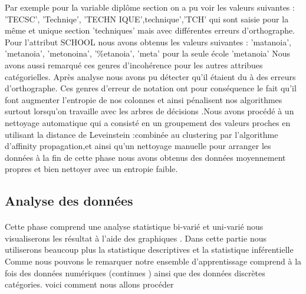 Par exemple pour la variable diplôme section on a pu voir les valeurs suivantes : 'TECSC', 'Techniqe',
'TECHN IQUE',technique','TCH' qui sont saisie pour la même et unique
section 'techniques' mais avec différentes erreurs d'orthographe. \\
Pour l'attribut SCHOOL nous avons obtenus les valeurs suivantes :
'matanoia', 'metanoia', 'metonoina', '\%etanoia', 'meta' pour la seule école 'metanoia'
Nous avons aussi remarqué ces genres d'incohérence pour les autres attribues catégorielles.  
Après analyse nous avons pu détecter qu'il étaient  du à des erreurs d'orthographe.
Ces genres d'erreur de notation ont pour conséquence le fait qu'il font
augmenter l'entropie de nos colonnes et ainsi pénalisent nos algorithmes
surtout lorsqu'on travaille avec les arbres de décisions .Nous avons
procédé à un nettoyage automatique qui a consisté en un groupement des
valeurs proches en utilisant la distance de Leveinstein :\cite{LevStack}combinée au  clustering par l'algorithme d'affinity propagation,et
ainsi qu'un nettoyage manuelle pour arranger les données à la fin de
cette phase nous avons obtenus des données moyennement propres et bien
nettoyer avec un entropie faible.
 \subsection{Analyse des données}\label{analyse-des-donnuxe9es}
\paragraph{}
Cette phase comprend une analyse statistique bi-varié et uni-varié nous
visualiserons les résultat à l'aide des graphiques . Dans cette partie
nous utiliserons beaucoup plus la statistique descriptives et la statistique inférentielle
Comme nous  pouvons le remarquer notre ensemble d'apprentissage
comprend à la fois des données numériques (continues ) ainsi que des
données discrètes catégories. voici comment nous allons procéder

